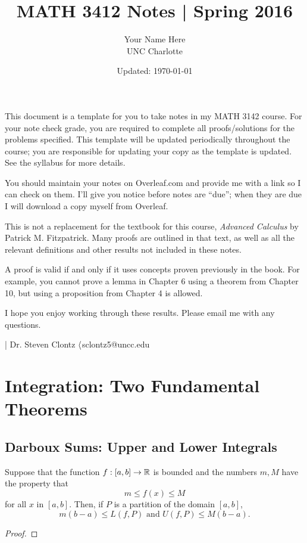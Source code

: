 \documentclass[letterpaper, twoside, 12pt]{book}
\title{MATH 3412 Notes | Spring 2016}
\date{Updated: \today}
\author{Your Name Here\\ UNC Charlotte}
\begin{document}
\maketitle

This document is a template for you to take notes in my MATH 3142 course.
For your note check grade, you are required to complete all proofs/solutions
for the problems specified. This template will be updated periodically
throughout the course; you are responsible for updating your copy
as the template is updated. See the syllabus for more details.

You should maintain your notes on Overleaf.com and provide me with a
link so I can check on them. I'll give you notice before notes are ``due'';
when they are due I will download a copy myself from Overleaf.

This is not a replacement for the textbook for this course,
\textit{Advanced Calculus} by Patrick M. Fitzpatrick. Many proofs are
outlined in that text, as well as all the relevant definitions and other
results not included in these notes.

A proof is valid if and only if it uses concepts proven previously in
the book. For example, you cannot prove a lemma in Chapter 6 using
a theorem from Chapter 10, but using a proposition from Chapter 4
is allowed.

I hope you enjoy working through these results. Please email me with
any questions.

\noindent| Dr. Steven Clontz \(\langle\)sclontz5@uncc.edu\(\>\)
















\setcounter{chapter}{5}
\chapter{Integration: Two Fundamental Theorems}







\section{Darboux Sums: Upper and Lower Integrals}

\begin{lemma}[6.1]
  Suppose that the function \(f:[a,b]\to\mathbb R\) is bounded and the numbers
  \(m,M\) have the property that
  \[
    m\leq f(x)\leq M
  \]
  for all \(x\) in \([a,b]\). Then, if \(P\) is a partition of the domain
  \([a,b]\),
  \[
    m(b-a)\leq L(f,P)
      \text{ and }
    U(f,P)\leq M(b-a)
  .\]
\end{lemma}
\begin{proof}

\end{proof}
\end{document}
